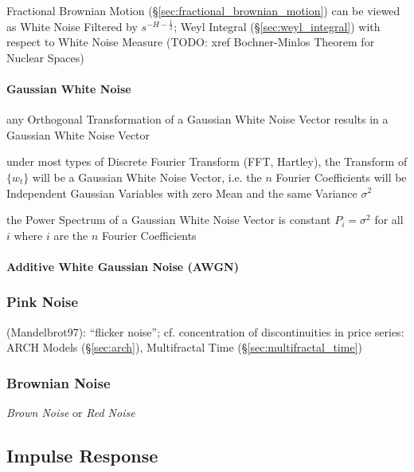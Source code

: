 Fractional Brownian Motion (\S\ref{sec:fractional_brownian_motion}) can be
viewed as White Noise Filtered by $s^{-H-\frac{1}{2}}$;
Weyl Integral (\S\ref{sec:weyl_integral}) with respect to White Noise Measure
(TODO: xref Bochner-Minlos Theorem for Nuclear Spaces)



\paragraph{Gaussian White Noise}\label{sec:gaussian_white_noise}\hfill

any Orthogonal Transformation of a Gaussian White Noise Vector results in a
Gaussian White Noise Vector

under most types of Discrete Fourier Transform (FFT, Hartley), the Transform of
$\{ w_t \}$ will be a Gaussian White Noise Vector, i.e. the $n$ Fourier
Coefficients will be Independent Gaussian Variables with zero Mean and the same
Variance $\sigma^2$

the Power Spectrum of a Gaussian White Noise Vector is constant $P_i = \sigma^2$
for all $i$ where $i$ are the $n$ Fourier Coefficients



\paragraph{Additive White Gaussian Noise (AWGN)}\label{sec:awgn}\hfill



\subsubsection{Pink Noise}\label{sec:pink_noise}

(Mandelbrot97): ``flicker noise''; cf. concentration of discontinuities in price
series: ARCH Models (\S\ref{sec:arch}), Multifractal Time
(\S\ref{sec:multifractal_time})



\subsubsection{Brownian Noise}\label{sec:brownian_noise}

\emph{Brown Noise} or \emph{Red Noise}



\subsection{Impulse Response}\label{sec:impulse_response}

